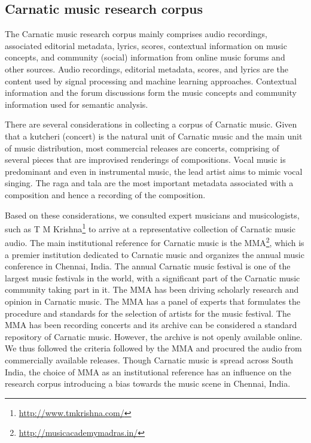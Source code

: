 \subsection{Carnatic music research corpus}\label{sec:cmcmcorpora}
The Carnatic music research corpus mainly comprises audio recordings, associated editorial metadata, lyrics, scores, contextual information on music concepts, and community (social) information from online music forums and other sources. Audio recordings, editorial metadata, scores, and lyrics are the content used by signal processing and machine learning approaches. Contextual information and the forum discussions form the music concepts and community information used for semantic analysis. 

There are several considerations in collecting a corpus of Carnatic music. Given that a \gls{kutcheri} (concert) is the natural unit of Carnatic music and the main unit of music distribution, most commercial releases are concerts, comprising of several pieces that are improvised renderings of compositions. Vocal music is predominant and even in instrumental music, the lead artist aims to mimic vocal singing. The \gls{raga} and \gls{tala} are the most important metadata associated with a composition and hence a recording of the composition. 

Based on these considerations, we consulted expert musicians and musicologists, such as T M Krishna\footnote{\url{http://www.tmkrishna.com/}} to arrive at a representative collection of Carnatic music audio. The main institutional reference for Carnatic music is the \gls{MMA}\footnote{\url{http://musicacademymadras.in/}}, which is a premier institution dedicated to Carnatic music and organizes the annual music conference in Chennai, India. The annual Carnatic music festival is one of the largest music festivals in the world, with a significant part of the Carnatic music community taking part in it. The \gls{MMA} has been driving scholarly research and opinion in Carnatic music. The \gls{MMA} has a panel of experts that formulates the procedure and standards for the selection of artists for the music festival. The \gls{MMA} has been recording concerts and its archive can be considered a standard repository of Carnatic music. However, the archive is not openly available online. We thus followed the criteria followed by the \gls{MMA} and procured the audio from commercially available releases. Though Carnatic music is spread across South India, the choice of \gls{MMA} as an institutional reference has an influence on the research corpus introducing a bias towards the music scene in Chennai, India.

